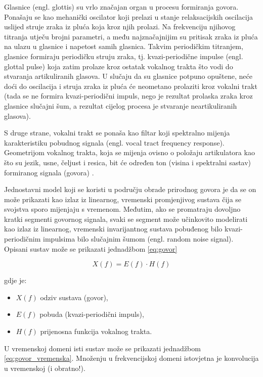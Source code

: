 Glasnice (engl. glottis) su vrlo značajan organ u procesu formiranja govora. 
Ponašaju se kao mehanički
oscilator koji prelazi u stanje relaksacijskih oscilacija uslijed struje zraka iz pluća koja kroz njih
prolazi. Na frekvenciju njihovog titranja utječu brojni parametri, a među najznačajnijim su
pritisak zraka iz pluća na ulazu u glasnice i napetost samih glasnica.
Takvim periodičkim titranjem, glasnice formiraju periodičku struju zraka, tj. 
kvazi-periodične impulse (engl. glottal pulse) koja zatim prolaze kroz ostatak 
vokalnog trakta što vodi do stvaranja artikuliranih glasova. U slučaju da 
su glasnice potpuno opuštene, neće
doći do oscilacija i struja zraka iz pluća će neometano prolaziti kroz vokalni trakt 
(tada se ne formira kvazi-periodični impuls, nego je rezultat prolaska zraka kroz glasnice
slučajni šum, a rezultat cijelog procesa je stvaranje neartikuliranih glasova). 

S druge strane, vokalni trakt se ponaša kao filtar koji spektralno mijenja karakteristiku
pobudnog signala (engl. vocal tract frequency response). 
Geometrijom vokalnog trakta, koja se mijenja ovisno o položaju 
artikulatora kao što su jezik, usne, čeljust i resica, bit će određen ton (visina i
spektralni sastav) formiranog signala (govora) \cite{petrinovic2002}. 

Jednostavni model koji se koristi u području obrade prirodnog govora je da se on 
može prikazati kao izlaz iz linearnog, vremenski promjenjivog sustava čija se 
svojstva sporo mijenjaju s vremenom. Međutim, ako se promatraju dovoljno kratki
segmenti govornog signala, svaki se segment može učinkovito modelirati kao izlaz
iz linearnog, vremenski invarijantnog sustava pobuđenog bilo
kvazi-periodičnim impulsima bilo slučajnim šumom (engl. random noise signal).
Opisani sustav može se prikazati jednadžbom \ref{eq:govor}

\begin{equation}
    X(f) = E(f) \cdot H(f)
    \label{eq:govor}
\end{equation}

gdje je:
\begin{itemize}
    \item \(X(f)\) odziv sustava (govor),
    \item \(E(f)\) pobuda (kvazi-periodični impuls),
    \item \(H(f)\) prijenosna funkcija vokalnog trakta.
\end{itemize}

U vremenskoj domeni isti sustav može se prikazati jednadžbom \ref{eq:govor_vremenska}.
Množenju u frekvencijskoj domeni istovjetna je konvolucija u vremenskoj (i obratno!).

